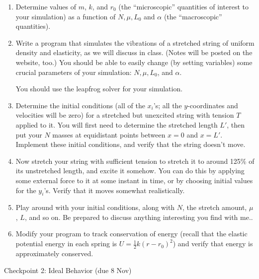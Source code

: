 \documentclass[12pt]{article}
\begin{document}
\begin{enumerate}

  \item{Determine values of $m$, $k$, and $r_0$ (the ``microscopic'' quantities of interest to your simulation) as a function of $N, \mu, L_0$ and $\alpha$ (the ``macroscopic'' quantities).}

  \item{Write a program that simulates the vibrations of a stretched string of uniform density and elasticity, as we will discuss in class. (Notes will be posted on the website, too.)
      You should be able to easily change (by setting variables) some crucial parameters of your simulation: $N, \mu, L_0$, and $\alpha$.

      You should use the leapfrog solver for your simulation.}

  \item{Determine the initial conditions (all of the $x_i$'s; all the $y$-coordinates and velocities will be zero) for a stretched but unexcited string with tension $T$ applied to it. You will first need to determine the stretched length $L'$, then put your $N$
    masses at equidistant points between $x=0$ and $x=L'$. Implement these initial conditions, and verify that the string doesn't move.} 

  \item{Now stretch your string with sufficient tension to stretch it to around 125\% of its unstretched length, and excite it somehow. You can do this by applying some external force to it at some instant in time, or by choosing initial values for the $y_i$'s.
    Verify that it moves somewhat realistically.}

  \item{Play around with your initial conditions, along with $N$, the stretch amount, $\mu$, $L$, and so on. Be prepared to discuss anything interesting you find with me..}

  \item{Modify your program to track conservation of energy (recall that the elastic potential energy in each spring is $U=\frac{1}{2}k(r-r_0)^2$) and verify that energy is approximately conserved.}

\end{enumerate}

\begin{center}\large Checkpoint 2: Ideal Behavior (due 8 Nov)\end{center}
\end{document}

